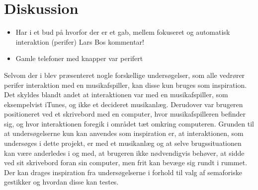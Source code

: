\chapter{Diskussion}
\label{Samlet Diskussion}
%
\begin{itemize}
  \item Har i et bud på hvorfor der er et gab, mellem fokuseret og automatisk interaktion (perifer) Lars Bos kommentar!
  \item Gamle telefoner med knapper var perifert
\end{itemize}
%
Selvom der i  blev præsenteret nogle forskellige undersøgelser, som alle vedrører perifer interaktion med en musikafspiller, kan disse kun bruges som inspiration. Det skyldes blandt andet at interaktionen var med en musikafspiller, som eksempelvist iTunes, og ikke et decideret musikanlæg. Derudover var brugeren positioneret ved et skrivebord med en computer, hvor musikafspilleren befinder sig, og hvor interaktionen foregik i området tæt omkring computeren. Grunden til at undersøgelserne kun kan anvendes som inspiration er, at interaktionen, som undersøges i dette projekt, er med et musikanlæg og at selve brugssituationen kan være anderledes i og med, at brugeren ikke nødvendigvis behøver, at sidde ved sit skrivebord foran sin computer, men frit kan bevæge sig rundt i rummet. Der kan drages inspiration fra undersøgelserne i forhold til valg af semaforiske gestikker og hvordan disse kan testes.\blankline
